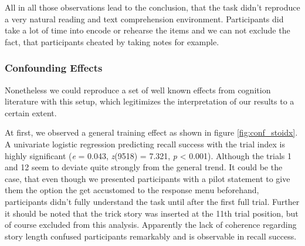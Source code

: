 \documentclass[a4paper,man,natbib,floatsintext,import]{apa6}
\begin{document}
All in all those observations lead to the conclusion, that the task didn't reproduce a very natural reading and text comprehension environment. Participants did take a lot of time into encode or rehearse the items and we can not exclude the fact, that participants cheated by taking notes for example.

\subsubsection{Confounding Effects}
Nonetheless we could reproduce a set of well known effects from cognition literature with this setup, which legitimizes the interpretation of our results to a certain extent.

At first, we observed a general training effect as shown in figure \ref{fig:conf_stoidx}. A univariate logistic regression predicting recall success with the trial index is highly significant (\textit{e} = 0.043, \textit{z}(9518) = 7.321,  \textit{p} < 0.001). Although the trials 1 and 12 seem to deviate quite strongly from the general trend. It could be the case, that even though we presented participants with a pilot statement to give them the option the get accustomed to the response menu beforehand, participants didn't fully understand the task until after the first full trial. Further it should be noted that the trick story was inserted at the 11th trial position, but of course excluded from this analysis. Apparently the lack of coherence regarding story length confused participants remarkably and is observable in recall success.
\end{document}
